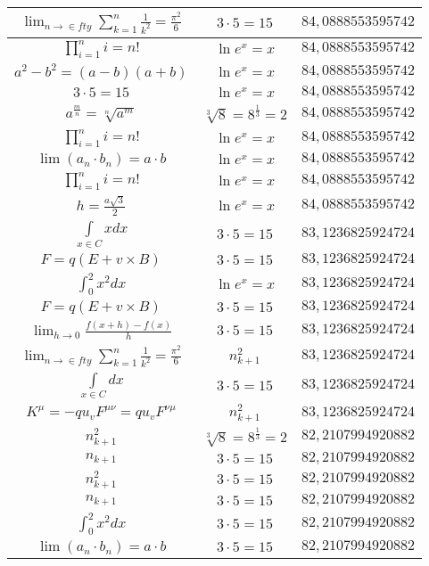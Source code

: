 \documentclass{article}
\begin{document}
\begin{flushleft}
\begin{longtable}{|c|c|c|}
$\lim_{n\to\in fty}\sum_{k=1}^n\frac{1}{k^2}=\frac{\pi^2}{6}$ & $3\cdot 5=15$ & $84,0888553595742$ \\ \hline 
$\prod_{i=1}^ni=n!$ & $\ln e^x=x$ & $84,0888553595742$ \\ \hline 
$a^2-b^2=(a-b)(a+b)$ & $\ln e^x=x$ & $84,0888553595742$ \\ \hline 
$3\cdot 5=15$ & $\ln e^x=x$ & $84,0888553595742$ \\ \hline 
$a^{\frac{m}{n}}=\sqrt[n]{a^{m}}$ & $\sqrt[3]{8}=8^{\frac{1}{3}}=2$ & $84,0888553595742$ \\ \hline 
$\prod_{i=1}^ni=n!$ & $\ln e^x=x$ & $84,0888553595742$ \\ \hline 
$\lim\left(a_n\cdot b_n\right)=a\cdot b$ & $\ln e^x=x$ & $84,0888553595742$ \\ \hline 
$\prod_{i=1}^ni=n!$ & $\ln e^x=x$ & $84,0888553595742$ \\ \hline 
$h=\frac{a\sqrt{3}}{2}$ & $\ln e^x=x$ & $84,0888553595742$ \\ \hline 
$\int \limits_{x\in C}xdx$ & $3\cdot 5=15$ & $83,1236825924724$ \\ \hline 
$F=q\left(E+v\times B\right)$ & $3\cdot 5=15$ & $83,1236825924724$ \\ \hline 
$\int _0^2x^2dx$ & $\ln e^x=x$ & $83,1236825924724$ \\ \hline 
$F=q\left(E+v\times B\right)$ & $3\cdot 5=15$ & $83,1236825924724$ \\ \hline 
$\lim_{h\to0}\frac{f(x+h)-f(x)}{h}$ & $3\cdot 5=15$ & $83,1236825924724$ \\ \hline 
$\lim_{n\to\in fty}\sum_{k=1}^n\frac{1}{k^2}=\frac{\pi^2}{6}$ & $n_{k+1}^2$ & $83,1236825924724$ \\ \hline 
$\int \limits_{x\in C}dx$ & $3\cdot 5=15$ & $83,1236825924724$ \\ \hline 
$K^\mu=-qu_vF^{\mu\nu}=qu_vF^{\nu\mu}$ & $n_{k+1}^2$ & $83,1236825924724$ \\ \hline 
$n_{k+1}^2$ & $\sqrt[3]{8}=8^{\frac{1}{3}}=2$ & $82,2107994920882$ \\ \hline 
$n_{k+1}$ & $3\cdot 5=15$ & $82,2107994920882$ \\ \hline 
$n_{k+1}^2$ & $3\cdot 5=15$ & $82,2107994920882$ \\ \hline 
$n_{k+1}$ & $3\cdot 5=15$ & $82,2107994920882$ \\ \hline 
$\int _0^2x^2dx$ & $3\cdot 5=15$ & $82,2107994920882$ \\ \hline 
$\lim\left(a_n\cdot b_n\right)=a\cdot b$ & $3\cdot 5=15$ & $82,2107994920882$ \\ \hline 

\end{longtable}
\end{flushleft}
\end{document}
